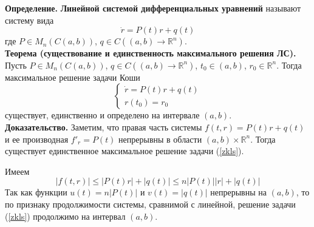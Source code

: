 \noindent \textbf{Определение.} \textbf{Линейной системой дифференциальных уравнений} называют систему вида
\begin{equation}
    \dot{r} = P(t)r + q(t) \label{lnsu}
\end{equation}
где $P \in M_n(C(a,b))$, $q \in C((a,b) \to \mathbb{R}^n)$.\\

\noindent \textbf{Теорема (существование и единственность максимального решения ЛС).} Пусть $P \in M_n(C(a,b))$, $q \in C((a,b) \to \mathbb{R}^n)$, $t_0 \in (a,b)$, $r_0 \in \mathbb{R}^n$. Тогда максимальное решение задачи Коши
\begin{equation}
    \begin{cases}
    \dot{r} = P(t)r + q(t)\\
    r(t_0) = r_0
    \end{cases} \label{zkls}
\end{equation}
существует, единственно и определено на интервале $(a,b)$.\\

\noindent \textbf{Доказательство.} Заметим, что правая часть системы $f(t,r) = P(t)r + q(t)$ и ее производная $f'_r = P(t)$ непрерывны в области $(a,b) \times \mathbb{R}^n$. Тогда существует единственное максимальное решение задачи (\ref{zkls}).

Имеем
\begin{equation*}
    |f(t,r)| \le |P(t)r| + |q(t)| \le n|P(t)||r| + |q(t)|
\end{equation*}
Так как функции $u(t) = n|P(t)|$ и $v(t) = |q(t)|$ непрерывны на $(a,b)$, то по признаку продолжимости системы, сравнимой с линейной, решение задачи (\ref{zkls}) продолжимо на интервал $(a,b)$.
